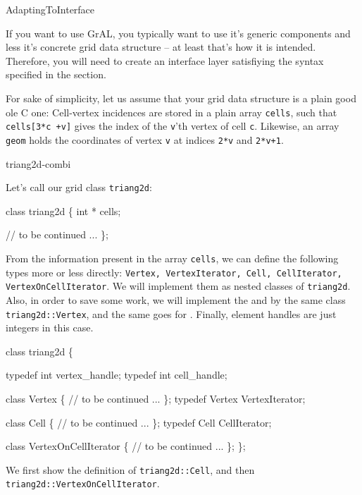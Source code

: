 \begin{Label}{AdaptingToInterface}
\end{Label}


If you want to use GrAL, you typically want to use it's generic
components and less it's concrete grid data structure
-- at least that's how it is intended.
Therefore, you will need to create an interface layer 
satisfiying the syntax specified in the  section.

For sake of simplicity, let us assume that your grid data structure
is a plain  good ole C one:
Cell-vertex incidences are stored in a plain array \texttt{cells},
such that \texttt{cells[3*c +v]} gives the index of the \texttt{v}'th vertex
of cell \texttt{c}. 
Likewise, an array \texttt{geom} 
holds the coordinates of vertex \texttt{v}
at indices \texttt{2*v} and \texttt{2*v+1}.

\begin{Label}{triang2d-combi}
\end{Label}

Let's call our grid class \texttt{triang2d}:
\begin{example}
class triang2d \{
  int * cells;

  // to be continued ...
\};
\end{example}
From the information present in the array \texttt{cells},
we can define  the following types more or less directly:
\texttt{Vertex, VertexIterator, Cell, CellIterator, VertexOnCellIterator}.
We will implement them as nested classes of \texttt{triang2d}.
Also, in order to save some work, we will implement the
 and  by the same class
\texttt{triang2d::Vertex},
and the same goes for .
Finally, element handles are just integers in this case.

\begin{example}
class triang2d \{

  typedef int vertex_handle;
  typedef int cell_handle;

  class Vertex \{
     // to be continued ...
  \};
  typedef Vertex VertexIterator;

  class Cell \{
     // to be continued ...
  \};
  typedef Cell   CellIterator;

  class VertexOnCellIterator \{
     // to be continued ...
  \};
\};
\end{example}
We first show the definition of \texttt{triang2d::Cell},
and then \texttt{triang2d::VertexOnCellIterator}.

